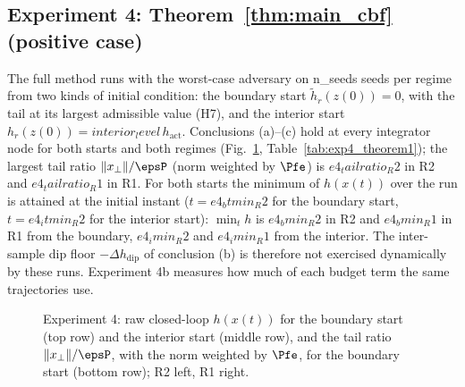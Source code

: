 \subsection{Experiment 4: Theorem~\ref{thm:main_cbf} (positive case)}
The full method runs with the worst-case adversary on {{n_seeds}} seeds per regime from two kinds of initial
condition: the boundary start \(\tilde h_r(z(0)) = 0\), with the tail at its largest admissible value (H7), and the
interior start \(h_r(z(0)) = {{interior_level}}\,h_{\mathrm{act}}\). Conclusions (a)--(c) hold at every integrator
node for both starts and both regimes (Fig.~\ref{fig:exp4}, Table~\ref{tab:exp4_theorem1}); the largest tail ratio
\(\|x_\perp\|/\epsP\) (norm weighted by \(\Pfe\)) is \({{e4_tailratio_R2}}\) in R2 and \({{e4_tailratio_R1}}\) in R1.
For both starts the minimum of \(h(x(t))\) over the run is attained at the initial instant
(\(t = {{e4_btmin_R2}}\) for the boundary start, \(t = {{e4_itmin_R2}}\) for the interior start): \(\min_t h\) is
\({{e4_bmin_R2}}\) in R2 and \({{e4_bmin_R1}}\) in R1 from the boundary, \({{e4_imin_R2}}\) and \({{e4_imin_R1}}\) from
the interior. The inter-sample dip floor \(-\Delta h_{\mathrm{dip}}\) of conclusion (b) is therefore not exercised
dynamically by these runs. Experiment 4b measures how much of each budget term the same trajectories use.

\begin{figure}[t]\centering{}
\caption{Experiment 4: raw closed-loop \(h(x(t))\) for the boundary start (top row) and the interior start (middle row),
and the tail ratio \(\|x_\perp\|/\epsP\), with the norm weighted by \(\Pfe\), for the boundary start (bottom row); R2 left, R1 right.}\label{fig:exp4}\end{figure}


